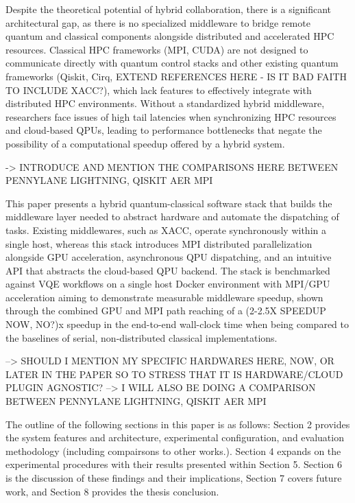    Despite the theoretical potential of hybrid collaboration, there is a significant architectural gap, as  
    there is no specialized middleware to bridge remote quantum and classical components alongside distributed and accelerated HPC resources. Classical HPC frameworks (MPI, CUDA)
    are not designed to communicate directly with quantum control stacks and other existing quantum frameworks (Qiskit, Cirq, EXTEND REFERENCES HERE - IS IT BAD FAITH TO INCLUDE XACC?), which  
    lack features to effectively integrate with distributed HPC environments. Without a standardized hybrid middleware, researchers face issues of high tail latencies when synchronizing
    HPC resources and cloud-based QPUs, leading to performance bottlenecks that negate the possibility of a computational speedup offered by a
    hybrid system. 

    -> INTRODUCE AND MENTION THE COMPARISONS HERE BETWEEN PENNYLANE LIGHTNING, QISKIT AER MPI


    This paper presents a hybrid quantum-classical software stack that builds the middleware layer needed
    to abstract hardware and automate the dispatching of tasks. Existing middlewares, such as XACC, operate synchronously within a single host, whereas this stack introduces MPI distributed parallelization alongside 
    GPU acceleration, asynchronous QPU dispatching, and an intuitive API that abstracts the cloud-based QPU backend. The stack is benchmarked against VQE workflows 
    on a single host Docker environment with MPI/GPU acceleration aiming to demonstrate measurable middleware speedup, shown through the combined GPU and MPI path reaching of a (2-2.5X SPEEDUP NOW, NO?)x 
    speedup in the end-to-end wall-clock time when being compared to the baselines of serial, non-distributed classical implementations. 

    --> SHOULD I MENTION MY SPECIFIC HARDWARES HERE, NOW, OR LATER IN THE PAPER SO TO STRESS THAT IT IS HARDWARE/CLOUD PLUGIN AGNOSTIC?
    --> I WILL ALSO BE DOING A COMPARISON BETWEEN PENNYLANE LIGHTNING, QISKIT AER MPI

    The outline of the following sections in this paper is as follows: Section 2
    provides the system features and architecture, experimental configuration, and evaluation methodology (including compairsons to other works.). Section 4 expands on the experimental procedures with their results presented within Section 5. 
    Section 6 is the discussion of these findings and their implications, Section 7 covers future work, and Section 8 provides the thesis conclusion. 
